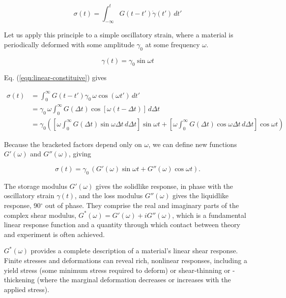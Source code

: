 \begin{equation}
  \label{eqn:linear-constituive}
  \sigma(t) = \int_{-\infty}^t G(t - t')\dot{\gamma}(t')\, dt'
\end{equation}

\noindent Let us apply this principle to a simple oscillatory strain, where a material is periodically deformed with some amplitude $\gamma_0$ at some frequency $\omega$.

\begin{equation}
  \gamma(t) = \gamma_0 \sin \omega t
\end{equation}

\noindent Eq. (\ref{eqn:linear-constituive}) gives

\begin{equation}
  \begin{aligned}
    \sigma(t) &= \int_0^\infty G(t - t') \gamma_0\,\omega \cos(\omega t')\, dt'\\
    &= \gamma_0\,\omega \int_0^\infty G(\Delta t) \cos[\omega (t - \Delta t)]\, d\Delta t\\
    &= \gamma_0 \left(\left[\omega \int_0^\infty G(\Delta t) \sin \omega \Delta t\, d\Delta t \right] \sin \omega t + \left[\omega \int_0^\infty G(\Delta t) \cos \omega \Delta t\, d\Delta t \right] \cos \omega t \right)
  \end{aligned}
\end{equation}

\noindent Because the bracketed factors depend only on $\omega$, we can define new functions $G'(\omega)$ and $G''(\omega)$, giving

\begin{equation}
  \sigma(t) = \gamma_0\, (G'(\omega) \sin \omega t + G''(\omega) \cos \omega t).
\end{equation}

\noindent The storage modulus $G'(\omega)$ gives the solidlike response, in phase with the oscillatory strain $\gamma(t)$, and the loss modulus $G''(\omega)$ gives the liquidlike response, 90$^\circ$ out of phase. They comprise the real and imaginary parts of the complex shear modulus, $G^*(\omega) = G'(\omega) + iG''(\omega)$, which is a fundamental linear response function and a quantity through which contact between theory and experiment is often achieved.

$G^*(\omega)$ provides a complete description of a material's linear shear response. Finite stresses and deformations can reveal rich, nonlinear responses, including a yield stress (some minimum stress required to deform) or shear-thinning or -thickening (where the marginal deformation decreases or increases with the applied stress).
